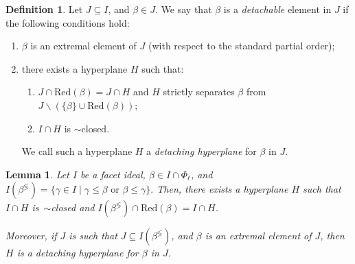 \documentclass[10pt]{amsart}
\newtheorem{lem}[thm]{Lemma}
\theoremstyle{definition}
\newtheorem{defi}[thm]{Definition}
\theoremstyle{remark}
\newcommand\smeno{\smallsetminus}
\newcommand\be{\beta}
\newcommand\ga{\gamma}
\newcommand\comp{\lessgtr}
\newcommand\red{\mathrm{Red}}
\renewcommand{\leq}{\leqslant}
\begin{document}
\begin{defi}\label{def:detachable}
Let $J\subseteq I$, and $\be\in J$.
We say that $\be$ is a {\it detachable} element in $J$ if the following conditions hold:
\begin{enumerate}
\item
$\be$ is an extremal element of $J$ \upn(with respect to the standard partial order\upn); 
\label{itm:extremal}
\item there exists a hyperplane $H$ such that:
\begin{enumerate}[label=\textup{(\alph*)}]
\item  $J\cap \red(\be)=J\cap H$ and $H$ strictly separates $\be$ from $J\smeno(\{\be\}\cup \red(\be))$;
\label{itm:separa}
\item
$I\cap H $ is  $\sim$closed.
\label{itm:chiuso} 
\end{enumerate}
\label{itm:hyperplane}
We call such a hyperplane $H$ a {\it detaching hyperplane} for $\be$ in $J$.
\end{enumerate}
\end{defi}


\begin{lem}\label{lem:detachable}
Let $I$ be a facet ideal, $\be\in I\cap \Phi_\ell$, and $I(\be^{\comp})=\{\ga\in I\mid \ga\leq\be\text{ or } \be\leq \ga\}.$ 
Then, there exists a hyperplane $H$ such that $I\cap H$ is~$\sim$closed  and $I(\be^{\comp})\cap \red(\be)=I\cap H$.
\par
Moreover, if $J$ is such that $J\subseteq I(\be^{\comp})$, and $\be$ is an extremal element of $J$, then $H$ is a detaching hyperplane for $\be$ in $J$.
\end{lem}
\end{document}
